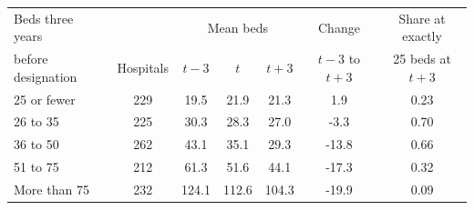 \begin{tabular}{lcccccc}
\toprule
Beds three years & & \multicolumn{3}{c}{Mean beds} & Change & Share at exactly \\
before designation & Hospitals & $t-3$ & $t$ & $t+3$ & $t-3$ to $t+3$ & 25 beds at $t+3$ \\
\midrule
25 or fewer & 229 & 19.5 & 21.9 & 21.3 & 1.9 & 0.23 \\
26 to 35 & 225 & 30.3 & 28.3 & 27.0 & -3.3 & 0.70 \\
36 to 50 & 262 & 43.1 & 35.1 & 29.3 & -13.8 & 0.66 \\
51 to 75 & 212 & 61.3 & 51.6 & 44.1 & -17.3 & 0.32 \\
More than 75 & 232 & 124.1 & 112.6 & 104.3 & -19.9 & 0.09 \\
\bottomrule
\end{tabular}
